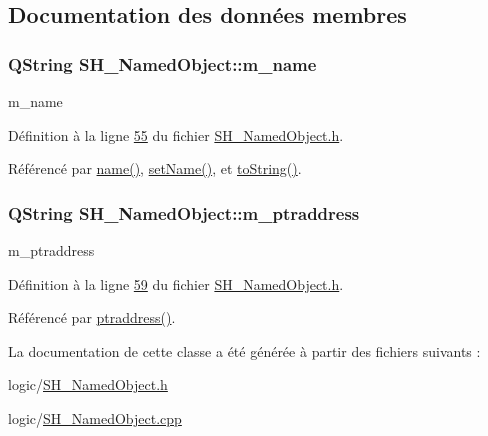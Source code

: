 \subsection{Documentation des données membres}
\hypertarget{classSH__NamedObject_a7f8e3346256986c337a792339ea5a015}{
\subsubsection[{m\-\_\-name}]{\setlength{\rightskip}{0pt plus 5cm}Q\-String S\-H\-\_\-\-Named\-Object\-::m\-\_\-name\hspace{0.3cm}{\ttfamily [private]}}}\label{classSH__NamedObject_a7f8e3346256986c337a792339ea5a015}


m\-\_\-name 



Définition à la ligne \hyperlink{SH__NamedObject_8h_source_l00055}{55} du fichier \hyperlink{SH__NamedObject_8h_source}{S\-H\-\_\-\-Named\-Object.\-h}.



Référencé par \hyperlink{classSH__NamedObject_a970f265df31b28b2179bbbceb6170ac2}{name()}, \hyperlink{classSH__NamedObject_a18e1860b747e029eefa140f8324bb503}{set\-Name()}, et \hyperlink{classSH__NamedObject_af73e97f6476ca1ef3a22b159d179f5e7}{to\-String()}.

\hypertarget{classSH__NamedObject_acfc489299f90750082785bf9ac42f4ff}{
\subsubsection[{m\-\_\-ptraddress}]{\setlength{\rightskip}{0pt plus 5cm}Q\-String S\-H\-\_\-\-Named\-Object\-::m\-\_\-ptraddress\hspace{0.3cm}{\ttfamily [private]}}}\label{classSH__NamedObject_acfc489299f90750082785bf9ac42f4ff}


m\-\_\-ptraddress 



Définition à la ligne \hyperlink{SH__NamedObject_8h_source_l00059}{59} du fichier \hyperlink{SH__NamedObject_8h_source}{S\-H\-\_\-\-Named\-Object.\-h}.



Référencé par \hyperlink{classSH__NamedObject_a98806c492b55a54d01330bbecce5118b}{ptraddress()}.



La documentation de cette classe a été générée à partir des fichiers suivants \-:\begin{DoxyCompactItemize}
\item 
logic/\hyperlink{SH__NamedObject_8h}{S\-H\-\_\-\-Named\-Object.\-h}\item 
logic/\hyperlink{SH__NamedObject_8cpp}{S\-H\-\_\-\-Named\-Object.\-cpp}\end{DoxyCompactItemize}
